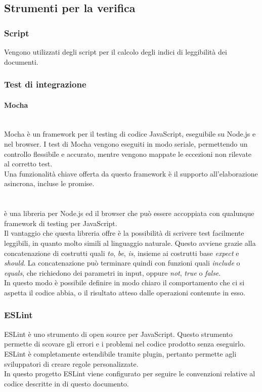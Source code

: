 \subsection{Strumenti per la verifica}
\subsubsection{Script}
Vengono utilizzati degli script per il calcolo degli indici di leggibilità dei documenti.

\subsubsection{Test di integrazione}
\paragraph{Mocha}\mbox{}\\
Mocha è un framework per il testing di codice JavaScript, eseguibile su Node.js e nel browser. I test di Mocha vengono eseguiti in modo seriale, permettendo un controllo flessibile e accurato, mentre vengono mappate le eccezioni non rilevate al corretto test.\\
Una funzionalità chiave offerta da questo framework è il supporto all’elaborazione asincrona, incluse le promise.

\paragraph{}\mbox{}\\
 è una libreria  per Node.js ed il browser che può essere accoppiata con qualunque framework di testing per JavaScript.\\
Il vantaggio che questa libreria offre è la possibilità di scrivere test facilmente leggibili, in quanto molto simili al linguaggio naturale. Questo avviene grazie alla concatenazione di costrutti quali \textit{to}, \textit{be}, \textit{is}, insieme ai costrutti base \textit{expect} e \textit{should}. La concatenazione può terminare quindi con funzioni quali \textit{include} o \textit{equals}, che richiedono dei parametri in input, oppure \textit{not}, \textit{true} o \textit{false}.\\
In questo modo è possibile definire in modo chiaro il comportamento che ci si aspetta il codice abbia, o il risultato atteso dalle operazioni contenute in esso.

\subsubsection{ESLint} \label{sec:eslint}
ESLint è uno strumento di  open source per JavaScript. Questo strumento permette di scovare gli errori e i problemi nel codice prodotto senza eseguirlo.\\ ESLint è completamente estendibile tramite plugin, pertanto permette agli sviluppatori di creare regole personalizzate.\\
In questo progetto ESLint viene configurato per seguire le convenzioni relative al codice descritte in  di questo documento.
